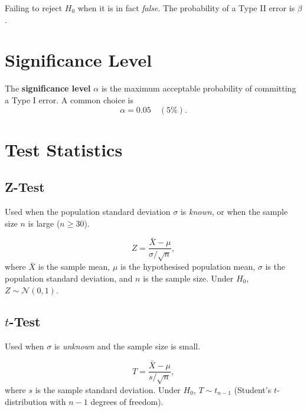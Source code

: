 \begin{definition}
Failing to reject $H_0$ when it is in fact \emph{false}. The probability of a Type II
error is $\beta$.
\end{definition}

\section{Significance Level}

\begin{definition}
The \textbf{significance level} $\alpha$ is the maximum acceptable probability of
committing a Type I error. A common choice is
\[
  \alpha = 0.05 \quad (5\%).
\]
\end{definition}

\section{Test Statistics}

\subsection{Z-Test}

Used when the population standard deviation $\sigma$ is \emph{known}, or when the
sample size $n$ is large ($n \geq 30$).

\begin{definition}
\[
  Z = \frac{\bar{X} - \mu}{\sigma / \sqrt{n}},
\]
where $\bar{X}$ is the sample mean, $\mu$ is the hypothesised population mean,
$\sigma$ is the population standard deviation, and $n$ is the sample size.
Under $H_0$, $Z \sim \mathcal{N}(0,1)$.
\end{definition}

\subsection{$t$-Test}

Used when $\sigma$ is \emph{unknown} and the sample size is small.

\begin{definition}
\[
  T = \frac{\bar{X} - \mu}{s / \sqrt{n}},
\]
where $s$ is the sample standard deviation. Under $H_0$, $T \sim t_{n-1}$
(Student's $t$-distribution with $n-1$ degrees of freedom).
\end{definition}

